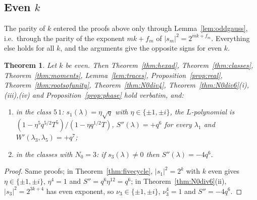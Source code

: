 \documentclass[12pt,a4paper]{amsart}
\newtheorem{theorem}{Theorem}[section]
\theoremstyle{definition}
\newcommand{\Spp}{S''}
\begin{document}
\subsection{Even \texorpdfstring{$k$}{k}}\label{subsec:evenk}
The parity of $k$ entered the proofs above only through Lemma~\ref{lem:oddgauss}, i.e.\ through the parity of the exponent $mk+f_m$ of $|s_m|^2=2^{mk+f_m}$. Everything else holds for all $k$, and the arguments give the opposite signs for even $k$.

\begin{theorem}\label{thm:evenk}
Let $k$ be even. Then Theorem~\ref{thm:hexad}, Theorem~\ref{thm:classes}, Theorem~\ref{thm:moments}, Lemma~\ref{lem:traces}, Proposition~\ref{prop:real}, Theorem~\ref{thm:rootsofunity}, Theorem~\ref{thm:N0div4}, Theorem~\ref{thm:N0div6}\textup{(i),(iii),(iv)} and Proposition~\ref{prop:phase} hold verbatim, and:
\begin{enumerate}[label=\textup{(\roman*)},leftmargin=2em]
\item in the class $5\,1$: $s_1(\lambda)=\eta\sqrt q$ with $\eta\in\{\pm1,\pm i\}$, the $L$-polynomial is $(1-\eta^5q^{5/2}T^5)/(1-\eta q^{1/2}T)$, $\Spp(\lambda)=+q^6$ for every $\lambda_1$ and $W'(\lambda_3,\lambda_5)=+q^7$;
\item in the classes with $N_0=3$: if $s_3(\lambda)\ne0$ then $\Spp(\lambda)=-4q^6$.
\end{enumerate}
\end{theorem}
\begin{proof}
Same proofs; in Theorem~\ref{thm:fivecycle}, $|s_1|^2=2^k$ with $k$ even gives $\eta\in\{\pm1,\pm i\}$, $\eta^4=1$ and $\Spp=q^6\eta^{12}=q^6$; in Theorem~\ref{thm:N0div6}(ii), $|s_3|^2=2^{3k+4}$ has even exponent, so $\nu_3\in\{\pm1,\pm i\}$, $\nu_3^4=1$ and $\Spp=-4q^6$.
\end{proof}
\end{document}
